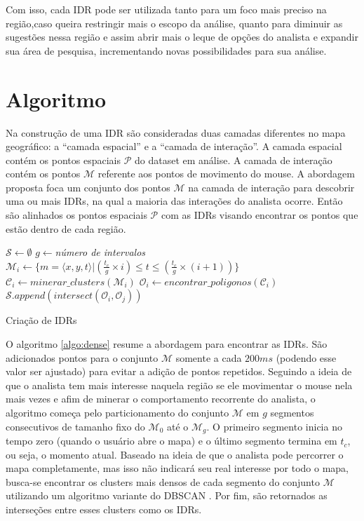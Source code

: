 Com isso, cada IDR pode ser utilizada tanto para um foco mais preciso na região,caso queira restringir mais o escopo da análise, quanto para diminuir as sugestões nessa região e assim abrir mais o leque de opções do analista e expandir sua área de pesquisa, incrementando novas possibilidades para sua análise.

\section{Algoritmo}

Na construção de uma IDR são consideradas duas camadas diferentes no mapa geográfico: a ``camada espacial'' e a ``camada de interação''. A camada espacial contém os pontos espaciais $\mathcal{P}$ do dataset em análise. A camada de interação  contém os pontos $\mathcal{M}$ referente aos pontos de movimento do mouse. A abordagem proposta foca um conjunto dos pontos $\mathcal{M}$ na camada de interação para descobrir uma ou mais IDRs, na qual a maioria das interações do analista ocorre. Então são alinhados os pontos espaciais $\mathcal{P}$ com as IDRs visando encontrar os pontos que estão dentro de cada região. 

\begin{algorithm}[!h]
        \DontPrintSemicolon
        $\mathcal{S} \gets \emptyset$\;
        $g \gets ${\em número de intervalos}\;
        {
               $\mathcal{M}_i \gets \{m = \langle x,y,t \rangle | (\frac{t_c}{g} \times i) \leq t \leq (\frac{t_c}{g} \times (i+1))\}$\;
               $\mathcal{C}_i \gets \mathit{minerar\_clusters}(\mathcal{M}_i)$\label{ln:mine}\;
               $\mathcal{O}_i \gets \mathit{encontrar\_poligonos}(\mathcal{C}_i)$\label{ln:poly}\;
        }
        {
            $\mathcal{S}.\mathit{append}(\mathit{intersect}(\mathcal{O}_i, \mathcal{O}_j))$
        }
        \;  
        \caption{Criação de IDRs}
        \label{algo:dense}
\end{algorithm}

O algoritmo \ref{algo:dense} resume a abordagem para encontrar as IDRs. São adicionados pontos para o conjunto $\mathcal{M}$ somente a cada $200ms$ (podendo esse valor ser ajustado) para evitar a adição de pontos repetidos. Seguindo a ideia de que o analista tem mais interesse naquela região se ele movimentar o mouse nela mais vezes e afim de minerar o comportamento recorrente do analista, o algoritmo começa pelo particionamento do conjunto $\mathcal{M}$ em $g$ segmentos consecutivos de tamanho fixo do $\mathcal{M}_0$ até o $\mathcal{M}_g$. O primeiro segmento inicia no tempo zero (quando o usuário abre o mapa) e o último segmento termina em $t_c$, ou seja, o momento atual. Baseado na ideia de que o analista pode percorrer o mapa completamente, mas isso não indicará seu real interesse por todo o mapa, busca-se encontrar os clusters mais densos de cada segmento do conjunto $\mathcal{M}$ utilizando um algoritmo variante do DBSCAN \cite{Ester:1996:DAD:3001460.3001507}. Por fim, são retornados as interseções entre esses clusters como os IDRs.

